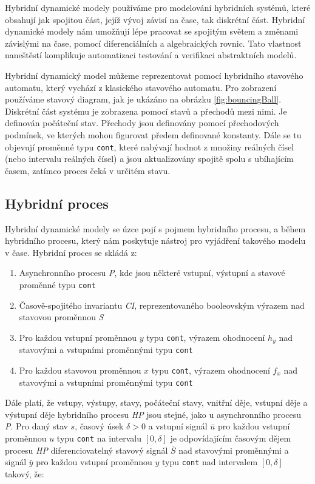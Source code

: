 \documentclass[conference,a4paper]{IEEEtran-CZ}
\begin{document}
Hybridní dynamické modely používáme pro modelování hybridních systémů, které obsahují 
jak spojitou část, jejíž vývoj závisí na čase, tak diskrétní část. Hybridní dynamické modely 
nám umožňují lépe pracovat se spojitým světem a změnami závislými na čase, pomocí 
diferenciálních a algebraických rovnic. Tato vlastnost naneštěstí komplikuje automatizaci testování 
a verifikaci abstraktních modelů.

Hybridní dynamický model můžeme reprezentovat pomocí hybridního stavového 
automatu, který vychází z klasického stavového automatu. Pro zobrazení používáme 
stavový diagram, jak je ukázáno na obrázku \ref{fig:bouncingBall}. Diskrétní část systému 
je zobrazena pomocí stavů a přechodů mezi nimi. Je definován počáteční stav. 
Přechody jsou definovány pomocí přechodových podmínek, ve kterých mohou figurovat 
předem definované konstanty. Dále se tu objevují proměnné typu \texttt{cont}, které 
nabývají hodnot z množiny reálných čísel (nebo intervalu reálných čísel) 
a jsou aktualizovány spojitě spolu s ubíhajícím časem, zatímco proces čeká v určitém stavu.

\subsection{Hybridní proces}

Hybridní dynamické modely se úzce pojí s pojmem hybridního procesu, a během hybridního procesu, 
který nám poskytuje nástroj pro vyjádření takového modelu v čase. Hybridní proces se skládá z:\cite{Rajeev:2015}

\begin{enumerate}
  \item Asynchronního procesu \textit{P}, kde jsou některé vstupní, výstupní a stavové proměnné typu \texttt{cont}
  \item Časově-spojitého invariantu \textit{CI}, reprezentovaného booleovským výrazem nad stavovou proměnnou \textit{S}
  \item Pro každou vstupní proměnnou $y$ typu \texttt{cont}, výrazem ohodnocení $h_y$ nad stavovými a vstupními proměnnými typu \texttt{cont}
  \item Pro každou stavovou proměnnou $x$ typu \texttt{cont}, výrazem ohodnocení $f_x$ nad stavovými a vstupními proměnnými typu \texttt{cont}
\end{enumerate}

\medskip

Dále platí, že vstupy, výstupy, stavy, počáteční stavy, vnitřní děje, vstupní děje a výstupní děje 
hybridního procesu \textit{HP} jsou stejné, jako u asynchronního procesu \textit{P}. Pro daný stav $s$, časový úsek 
$\delta > 0$ a vstupní signál $\bar{u}$ pro každou vstupní proměnnou $u$ typu \texttt{cont} na intervalu
$[0,\delta]$ je odpovídajícím časovým dějem procesu \textit{HP} diferenciovatelný stavový signál  $\bar{S}$
nad stavovými proměnnými a signál  $\bar{y}$ pro každou vstupní proměnnou $y$ typu \texttt{cont} nad
intervalem $[0,\delta]$ takový, že:\cite{Rajeev:2015}
\end{document}
